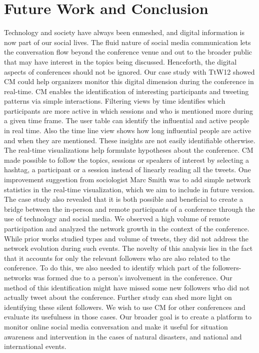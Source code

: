 \documentclass[conference,final]{IEEEtran}
\begin{document}

\balance 
\section{Future Work and Conclusion}
Technology and society have always been enmeshed, and digital information is now part of our social lives. The fluid nature of social media communication lets the conversation flow beyond the conference venue and out to the broader public that may have interest in the topics being discussed. Henceforth, the digital aspects of conferences should not be ignored. Our case study with TtW12 showed CM could help organizers monitor this digital dimension during the conference in real-time. CM enables the identification of interesting participants and tweeting patterns via simple interactions. Filtering views by time identifies which participants are more active in which sessions and who is mentioned more during a given time frame. The user table can identify the influential and active people in real time. Also the time line view shows how long influential people are active and when they are mentioned. These insights are not easily identifiable otherwise. The real-time visualizations help formulate hypotheses about the conference. CM made possible to follow the topics, sessions or speakers of interest by selecting a hashtag, a participant or a session instead of linearly reading all the tweets. One improvement suggestion from sociologist Marc Smith was to add simple network statistics in the real-time visualization, which we aim to include in future version. The case study also revealed that it is both possible and beneficial to create a bridge between the in-person and remote participants of a conference through the use of technology and social media. We observed a high volume of remote participation and analyzed the network growth in the context of the conference. While prior works studied types and volume of tweets, they did not address the network evolution during such events. The novelty of this analysis lies in the fact that it accounts for only the relevant followers who are also related to the conference. To do this, we also needed to identify which part of the followers-networks was formed due to a person's involvement in the conference. Our method of this identification might have missed some new followers who did not actually tweet about the conference. Further study can shed more light on identifying these silent followers. We wish to use CM for other conferences and evaluate its usefulness in those cases. Our broader goal is to create a platform to monitor online social media conversation and make it useful for situation awareness and intervention in the cases of natural disasters, and national and international events. 
\end{document}
